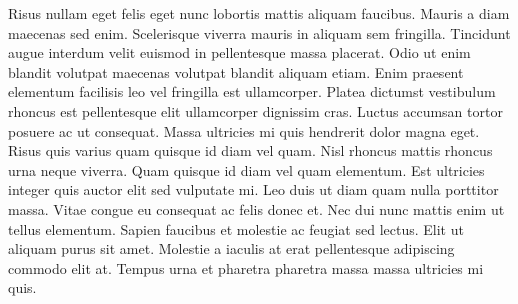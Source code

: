 Risus nullam eget felis eget nunc lobortis mattis aliquam faucibus. Mauris a diam maecenas sed enim. Scelerisque viverra mauris in aliquam sem fringilla. Tincidunt augue interdum velit euismod in pellentesque massa placerat. Odio ut enim blandit volutpat maecenas volutpat blandit aliquam etiam. Enim praesent elementum facilisis leo vel fringilla est ullamcorper. Platea dictumst vestibulum rhoncus est pellentesque elit ullamcorper dignissim cras. Luctus accumsan tortor posuere ac ut consequat. Massa ultricies mi quis hendrerit dolor magna eget. Risus quis varius quam quisque id diam vel quam.
Nisl rhoncus mattis rhoncus urna neque viverra. Quam quisque id diam vel quam elementum. Est ultricies integer quis auctor elit sed vulputate mi. Leo duis ut diam quam nulla porttitor massa. Vitae congue eu consequat ac felis donec et. Nec dui nunc mattis enim ut tellus elementum. Sapien faucibus et molestie ac feugiat sed lectus. Elit ut aliquam purus sit amet. Molestie a iaculis at erat pellentesque adipiscing commodo elit at. Tempus urna et pharetra pharetra massa massa ultricies mi quis.

